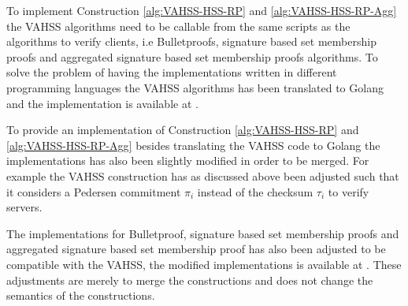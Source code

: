 To implement Construction \ref{alg:VAHSS-HSS-RP} and \ref{alg:VAHSS-HSS-RP-Agg}  the VAHSS algorithms need to be callable from the same scripts as the algorithms to verify clients, i.e Bulletproofs, signature based set membership proofs and aggregated signature based set membership proofs algorithms. To solve the problem of having the implementations written in different programming languages the  VAHSS algorithms has been translated to Golang and the implementation is available at \cite{Git:MyCode}. 

To provide an implementation of Construction \ref{alg:VAHSS-HSS-RP} and \ref{alg:VAHSS-HSS-RP-Agg} besides translating the VAHSS code to Golang the implementations has also been slightly modified in order to be  merged. For example the VAHSS construction has as discussed above been adjusted such that it considers a Pedersen commitment $\pi_i$ instead of the checksum $\tau_i$ to verify servers. 

The implementations for Bulletproof, signature based set membership proofs and aggregated signature based set membership proof has also been adjusted to be compatible with the VAHSS, the modified implementations is available at \cite{Git:MyCode}. These adjustments are merely to merge the constructions and does not change the semantics of the constructions.






